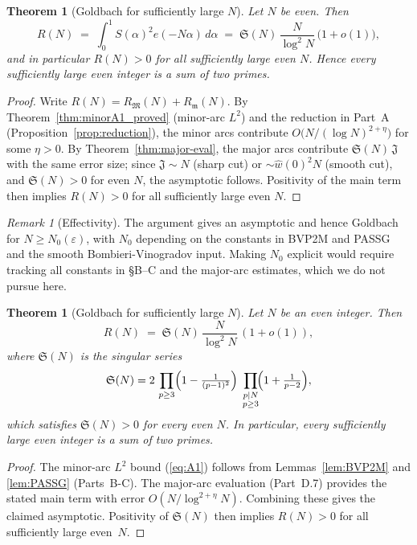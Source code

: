 \documentclass[11pt]{article}
\def\eqref#1{(\ref{#1})}%
\newtheorem{theorem}[lemma]{Theorem}
\theoremstyle{definition}
\theoremstyle{remark}
\newtheorem{remark}[lemma]{Remark}
\numberwithin{equation}{part}
\begin{document}
\begin{theorem}[Goldbach for sufficiently large $N$]\label{thm:goldbach_final}
	Let $N$ be even. Then
	\[
		R(N)\;=\;\int_0^1 S(\alpha)^2 e(-N\alpha)\,d\alpha
		\;=\;\mathfrak S(N)\,\frac{N}{\log^2 N}\,\bigl(1+o(1)\bigr),
	\]
	and in particular $R(N)>0$ for all sufficiently large even $N$. Hence every sufficiently large even integer is a sum of two primes.
\end{theorem}

\begin{proof}
	Write $R(N)=R_{\mathfrak M}(N)+R_{\mathfrak m}(N)$.
	By Theorem~\ref{thm:minorA1_proved} (minor-arc $L^2$) and the reduction in Part~A (Proposition~\ref{prop:reduction}), the minor arcs contribute $O\big(N/(\log N)^{2+\eta}\big)$ for some $\eta>0$.
	By Theorem~\ref{thm:major-eval}, the major arcs contribute $\mathfrak S(N)\,\mathfrak J$ with the same error size; since $\mathfrak J\sim N$ (sharp cut) or $\sim \widehat w(0)^2N$ (smooth cut), and $\mathfrak S(N)>0$ for even $N$, the asymptotic follows. Positivity of the main term then implies $R(N)>0$ for all sufficiently large even $N$.
\end{proof}

\begin{remark}[Effectivity]
	The argument gives an asymptotic and hence Goldbach for $N\ge N_0(\varepsilon)$, with $N_0$ depending on the constants in BVP2M and PASSG and the smooth Bombieri-Vinogradov input. Making $N_0$ explicit would require tracking all constants in \S B--C and the major-arc estimates, which we do not pursue here.
\end{remark}


\begin{theorem}[Goldbach for sufficiently large $N$]\label{thm:goldbach}
	Let $N$ be an even integer. Then
	\[
		R(N)\;=\;\mathfrak S(N)\,\frac{N}{\log^2 N}\,(1+o(1)),
	\]
	where $\mathfrak S(N)$ is the singular series
	\[
		\mathfrak S(N)
		=2\,\prod_{p\ge 3}\Bigl(1-\tfrac{1}{(p-1)^2}\Bigr)
		\;\prod_{\substack{p\mid N\\ p\ge 3}}\!\Bigl(1+\tfrac{1}{p-2}\Bigr),
	\]
	which satisfies $\mathfrak S(N)>0$ for every even $N$.
	In particular, every sufficiently large even integer is a sum of two primes.
\end{theorem}

\begin{proof}
	The minor-arc $L^2$ bound \eqref{eq:A1} follows from
	Lemmas~\ref{lem:BVP2M} and \ref{lem:PASSG} (Parts~B-C).
	The major-arc evaluation (Part~D.7) provides the stated main term with error $O(N/\log^{2+\eta}N)$.
	Combining these gives the claimed asymptotic.
	Positivity of $\mathfrak S(N)$ then implies $R(N)>0$ for all sufficiently large even~$N$.
\end{proof}
\end{document}
